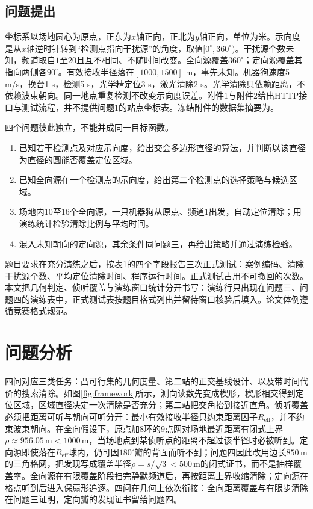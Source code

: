 \documentclass{cumcmthesis}
\begin{document}
\subsection{问题提出}

坐标系以场地圆心为原点，正东为$x$轴正向，正北为$y$轴正向，单位为米。示向度是从$x$轴逆时针转到“检测点指向干扰源”的角度，取值$[0^\circ,360^\circ)$。干扰源个数未知，频道取自$1$至$20$且互不相同、不随时间改变。全向源覆盖$360^\circ$；定向源覆盖其指向两侧各$90^\circ$。有效接收半径落在$[1000,1500]$ m，事先未知。机器狗速度5 m/s，换台1 s，检测5 s，光学精定位3 s，激光清除2 s。光学清除只依赖距离，不依赖波束朝向。同一地点重复检测不改变示向度误差。附件1与附件2给出HTTP接口与测试流程，并不提供问题1的站点坐标表。冻结附件的数据集摘要为。

四个问题彼此独立，不能并成同一目标函数。

\begin{enumerate}
\item 已知若干检测点及对应示向度，给出交会多边形直径的算法，并判断以该直径为直径的圆能否覆盖定位区域。
\item 已知全向源在一个检测点的示向度，给出第二个检测点的选择策略与候选区域。
\item 场地内10至16个全向源，一只机器狗从原点、频道1出发，自动定位清除；用演练统计检验清除比例与平均时间。
\item 混入未知朝向的定向源，其余条件同问题三，再给出策略并通过演练检验。
\end{enumerate}

题目要求在充分演练之后，按表1的四个字段报告三次正式测试：案例编码、清除干扰源个数、平均定位清除时间、程序运行时间。正式测试占用不可撤回的次数。本文把几何判定、侦听覆盖与演练窗口统计分开书写：演练行只出现在问题三、问题四的演练表中，正式测试表按题目格式列出并留待窗口核验后填入。论文体例遵循竞赛格式规范\cite{format}。

\section{问题分析}

四问对应三类任务：凸可行集的几何度量、第二站的正交基线设计、以及带时间代价的搜索清除。如图\ref{fig:framework}所示，测向读数先变成楔形，楔形相交得到定位区域，区域直径决定一次清除是否充分；第二站把交角抬到接近直角。侦听覆盖必须把距离可听与朝向可听分开：最小有效接收半径只约束距离因子$R_{\mathrm{eff}}$，并不约束波束朝向。在全向假设下，原点加8环的9点网对场地最近距离有闭式上界$\rho\approx 956.05\,\mathrm{m}<1000\,\mathrm{m}$，当场地点到某侦听点的距离不超过该半径时必被听到。定向源即使落在$R_{\mathrm{eff}}$球内，仍可因$180^\circ$瓣的背面而听不到；问题四因此改用边长$850\,\mathrm{m}$的三角格网，把发现写成覆盖半径$\rho=s/\sqrt{3}<500\,\mathrm{m}$的闭式证书，而不是抽样覆盖率。全向源在有限覆盖阶段扫完静默频道后，再按距离上界收缩清除；定向源在格点听到后进入保扇形追逐。四问在几何上依次衔接：全向距离覆盖与有限步清除在问题三证明，定向瓣的发现证书留给问题四。
\end{document}
